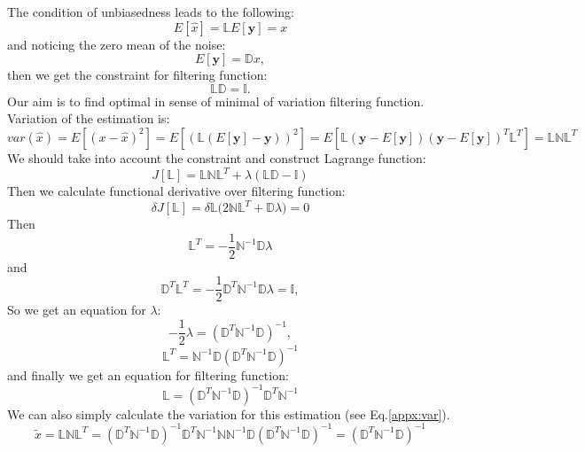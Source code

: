 The condition of unbiasedness leads to the following:
\begin{equation}
 E[\hat{x}] = \mathbb{L} E[\mathbf{y}] = x
\end{equation}
and noticing the zero mean of the noise:
\begin{equation}
 E[\mathbf{y}] = \mathbb{D} x,
\end{equation}
then we get the constraint for filtering function:
\begin{equation}\label{appx:constraint}
 \mathbb{L}\mathbb{D} = \mathbb{I}.
\end{equation}
Our aim is to find optimal in sense of minimal of variation filtering function.
Variation of the estimation is:
\begin{equation}\label{appx:var}
 var(\hat{x}) = E[(x-\hat{x})^2] = E[(\mathbb{L}(E[\mathbf{y}] - \mathbf{y}))^2] = E[\mathbb{L}(\mathbf{y}-E[\mathbf{y}])(\mathbf{y}-E[\mathbf{y}])^T\mathbb{L}^T] =\mathbb{L}\mathbb{N}\mathbb{L}^T 
\end{equation}
We should take into account the constraint\label{appx:constraint} and construct Lagrange function:
\begin{equation}
 J[\mathbb{L}] = \mathbb{L}\mathbb{N}\mathbb{L}^T + \lambda (\mathbb{L}\mathbb{D} - \mathbb{I})
\end{equation} 
Then we calculate functional derivative over filtering function:
\begin{equation}
 \delta J[\mathbb{L}] = \delta \mathbb{L} \bigl(2 \mathbb{N}\mathbb{L}^T + \mathbb{D}\lambda \bigr) = 0
\end{equation}
Then 
\begin{equation}
 \mathbb{L}^T = -\frac{1}{2}\mathbb{N}^{-1}\mathbb{D}\lambda
\end{equation}
and 
\begin{equation}
 \mathbb{D}^T\mathbb{L}^T =  -\frac{1}{2}\mathbb{D}^T\mathbb{N}^{-1}\mathbb{D}\lambda = \mathbb{I},
\end{equation}
So we get an equation for $\lambda$:
\begin{equation}
 -\frac{1}{2}\lambda = (\mathbb{D}^T\mathbb{N}^{-1}\mathbb{D})^{-1},
\end{equation}
\begin{equation}
 \mathbb{L}^T = \mathbb{N}^{-1}\mathbb{D}(\mathbb{D}^T\mathbb{N}^{-1}\mathbb{D})^{-1}
\end{equation}
and finally we get an equation for filtering function:
\begin{equation}\label{appx:est}
 \mathbb{L} = (\mathbb{D}^T\mathbb{N}^{-1}\mathbb{D})^{-1}\mathbb{D}^T\mathbb{N}^{-1}
\end{equation}
We can also simply calculate the variation for this estimation (see Eq.\ref{appx:var}).
\begin{equation}
 \tilde{x} = \mathbb{L}\mathbb{N}\mathbb{L}^T = (\mathbb{D}^T\mathbb{N}^{-1}\mathbb{D})^{-1}\mathbb{D}^T\mathbb{N}^{-1}\mathbb{N}\mathbb{N}^{-1}\mathbb{D}(\mathbb{D}^T\mathbb{N}^{-1}\mathbb{D})^{-1} = (\mathbb{D}^T\mathbb{N}^{-1}\mathbb{D})^{-1}
\end{equation}



